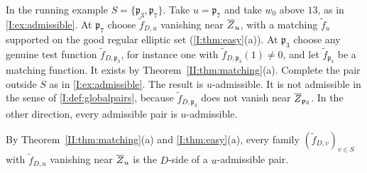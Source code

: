 \begin{example}\label{II:ex:uadm}
In the running example $S=\{\mathfrak p_3,\mathfrak p_7\}$. Take $u=\mathfrak p_7$ and take $w_0$ above $13$, as in \cref{I:ex:admissible}. At $\mathfrak p_7$ choose $\tilde f_{D,u}$ vanishing near $\overline{Z}_u$, with a matching $\tilde f_u$ supported on the good regular elliptic set (\cref{I:thm:easy}(a)). At $\mathfrak p_3$ choose any genuine test function $\tilde f_{D,\mathfrak p_3}$, for instance one with $\tilde f_{D,\mathfrak p_3}(1)\neq0$, and let $\tilde f_{\mathfrak p_3}$ be a matching function. It exists by Theorem~\ref{II:thm:matching}(a). Complete the pair outside $S$ as in \cref{I:ex:admissible}. The result is $u$-admissible. It is not admissible in the sense of \cref{I:def:globalpairs}, because $\tilde f_{D,\mathfrak p_3}$ does not vanish near $\overline{Z}_{\mathfrak p_3}$. In the other direction, every admissible pair is $u$-admissible.
\end{example}


By Theorem~\ref{II:thm:matching}(a) and \cref{I:thm:easy}(a), every family $(\tilde f_{D,v})_{v\in S}$ with $\tilde f_{D,u}$ vanishing near $\overline{Z}_u$ is the $D$-side of a $u$-admissible pair.

